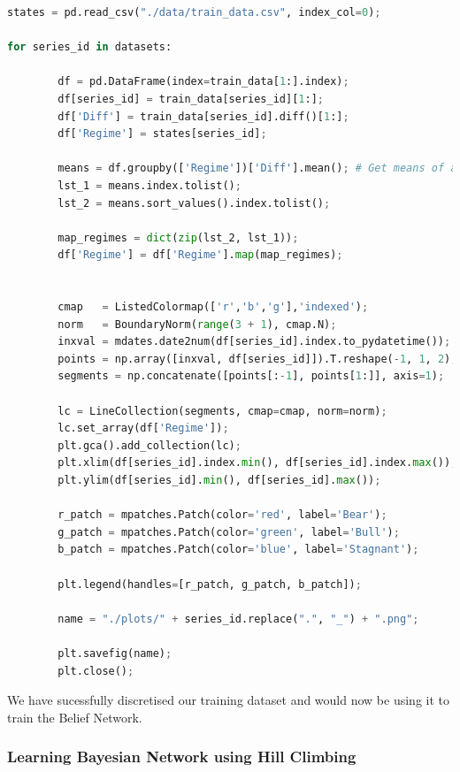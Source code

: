 \begin{lstlisting}[language=Python]
states = pd.read_csv("./data/train_data.csv", index_col=0);

for series_id in datasets:
    
        df = pd.DataFrame(index=train_data[1:].index);
        df[series_id] = train_data[series_id][1:];
        df['Diff'] = train_data[series_id].diff()[1:];
        df['Regime'] = states[series_id];
        
        means = df.groupby(['Regime'])['Diff'].mean(); # Get means of all assigned states
        lst_1 = means.index.tolist();
        lst_2 = means.sort_values().index.tolist();

        map_regimes = dict(zip(lst_2, lst_1));
        df['Regime'] = df['Regime'].map(map_regimes);
        
        
        cmap   = ListedColormap(['r','b','g'],'indexed');
        norm   = BoundaryNorm(range(3 + 1), cmap.N);
        inxval = mdates.date2num(df[series_id].index.to_pydatetime());
        points = np.array([inxval, df[series_id]]).T.reshape(-1, 1, 2);
        segments = np.concatenate([points[:-1], points[1:]], axis=1);

        lc = LineCollection(segments, cmap=cmap, norm=norm);
        lc.set_array(df['Regime']);
        plt.gca().add_collection(lc);
        plt.xlim(df[series_id].index.min(), df[series_id].index.max());
        plt.ylim(df[series_id].min(), df[series_id].max());

        r_patch = mpatches.Patch(color='red', label='Bear');
        g_patch = mpatches.Patch(color='green', label='Bull');
        b_patch = mpatches.Patch(color='blue', label='Stagnant');

        plt.legend(handles=[r_patch, g_patch, b_patch]);

        name = "./plots/" + series_id.replace(".", "_") + ".png";

        plt.savefig(name);
        plt.close();
\end{lstlisting}

We have sucessfully discretised our training dataset and would now be
using it to train the Belief Network.

\hypertarget{learning-bayesian-network-using-hill-climbing}{%
\subsubsection{Learning Bayesian Network using Hill
Climbing}\label{learning-bayesian-network-using-hill-climbing}}

